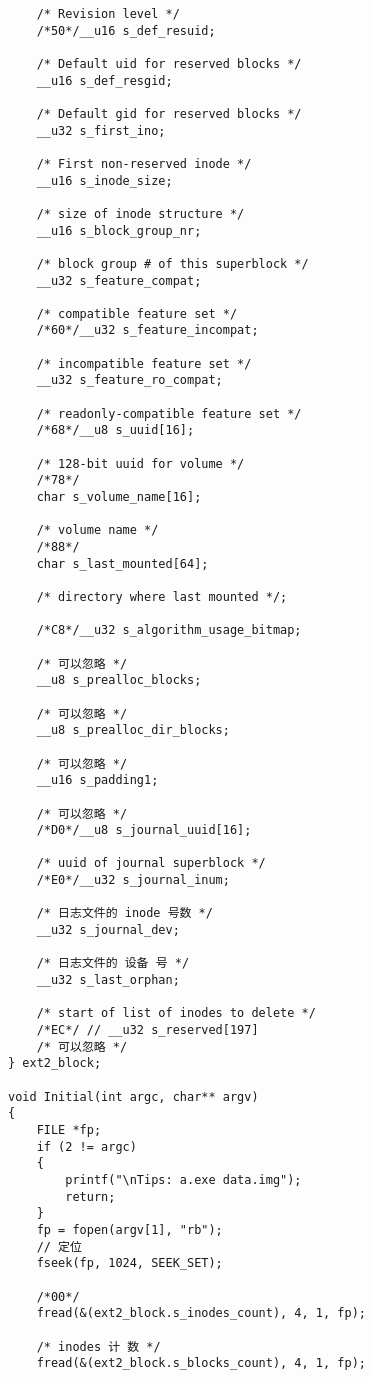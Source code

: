 \documentclass[UTF8]{ctexart}
\begin{document}
\begin{verbatim}
    /* Revision level */
    /*50*/__u16 s_def_resuid;

    /* Default uid for reserved blocks */
    __u16 s_def_resgid;

    /* Default gid for reserved blocks */
    __u32 s_first_ino;

    /* First non-reserved inode */
    __u16 s_inode_size;

    /* size of inode structure */
    __u16 s_block_group_nr;

    /* block group # of this superblock */
    __u32 s_feature_compat;

    /* compatible feature set */
    /*60*/__u32 s_feature_incompat;

    /* incompatible feature set */
    __u32 s_feature_ro_compat;

    /* readonly-compatible feature set */
    /*68*/__u8 s_uuid[16];

    /* 128-bit uuid for volume */
    /*78*/
    char s_volume_name[16];

    /* volume name */
    /*88*/
    char s_last_mounted[64];

    /* directory where last mounted */;

    /*C8*/__u32 s_algorithm_usage_bitmap;

    /* 可以忽略 */
    __u8 s_prealloc_blocks;

    /* 可以忽略 */
    __u8 s_prealloc_dir_blocks;

    /* 可以忽略 */
    __u16 s_padding1;

    /* 可以忽略 */
    /*D0*/__u8 s_journal_uuid[16];

    /* uuid of journal superblock */
    /*E0*/__u32 s_journal_inum;

    /* 日志文件的 inode 号数 */
    __u32 s_journal_dev;

    /* 日志文件的 设备 号 */
    __u32 s_last_orphan;

    /* start of list of inodes to delete */
    /*EC*/ // __u32 s_reserved[197]
    /* 可以忽略 */
} ext2_block;

void Initial(int argc, char** argv)
{
    FILE *fp;
    if (2 != argc)
    {
        printf("\nTips: a.exe data.img");
        return;
    }
    fp = fopen(argv[1], "rb");
    // 定位
    fseek(fp, 1024, SEEK_SET);

    /*00*/
    fread(&(ext2_block.s_inodes_count), 4, 1, fp);

    /* inodes 计 数 */
    fread(&(ext2_block.s_blocks_count), 4, 1, fp);


\end{verbatim}
\end{document}
